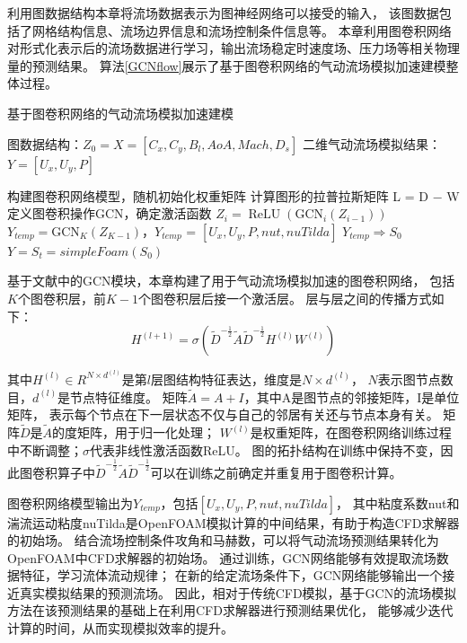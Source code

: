 利用图数据结构本章将流场数据表示为图神经网络可以接受的输入，
该图数据包括了网格结构信息、流场边界信息和流场控制条件信息等。
本章利用图卷积网络对形式化表示后的流场数据进行学习，输出流场稳定时速度场、压力场等相关物理量的预测结果。
算法\ref{GCNflow}展示了基于图卷积网络的气动流场模拟加速建模整体过程。

\renewcommand{\algorithmicrequire}{\textbf{输入：}}
\renewcommand{\algorithmicensure}{\textbf{输出：}}
\begin{algorithm}[htbp]
	\caption{基于图卷积网络的气动流场模拟加速建模}
	\label{GCNflow}
	\begin{algorithmic}[1]
		\REQUIRE 图数据结构：$Z_{0} = X = [C_x, C_y, B_l, AoA, Mach, D_s]$ 
		\ENSURE  二维气动流场模拟结果：$Y = [ U_x,U_y, P]$
		
		\STATE 构建图卷积网络模型，随机初始化权重矩阵
		\STATE 计算图形的拉普拉斯矩阵 L = D − W
		\STATE 定义图卷积操作GCN，确定激活函数
		\STATE $Z_{i} = \operatorname{ReLU}\left(\mathrm{GCN}_{i}\left(Z_{i-1}\right)\right) $
		\ENDFOR
		\STATE $Y_{temp} = \mathrm{GCN}_{K}\left(Z_{K-1}\right)$，$Y_{temp}$ = $[ U_x,U_y, P, nut, nuTilda]$
		\STATE $Y_{temp} \Rightarrow S_0$ 
		\STATE $Y = S_t = simpleFoam(S_0)$  
	\end{algorithmic}
\end{algorithm}

基于文献\cite{2016Semi}中的GCN模块，本章构建了用于气动流场模拟加速的图卷积网络，
包括$K$个图卷积层，前$K-1$个图卷积层后接一个激活层。
层与层之间的传播方式如下：
\begin{equation}
H^{(l+1)}=\sigma\left(\tilde{D}^{-\frac{1}{2}} \tilde{A} \tilde{D}^{-\frac{1}{2}} H^{(l)} W^{(l)}\right)
\end{equation}

\noindent 其中$H^{(l)} \in R^{N \times d^{(l)}}$是第$l$层图结构特征表达，维度是$N \times d^{(l)}$，
$N$表示图节点数目，$d^{(l)}$是节点特征维度。
矩阵$\tilde{A} = A + I$，其中A是图节点的邻接矩阵，I是单位矩阵，
表示每个节点在下一层状态不仅与自己的邻居有关还与节点本身有关。
矩阵$\tilde{D}$是$\tilde{A}$的度矩阵，用于归一化处理；
$W^{(l)}$是权重矩阵，在图卷积网络训练过程中不断调整；$\sigma$代表非线性激活函数ReLU。
图的拓扑结构在训练中保持不变，因此图卷积算子中$\tilde{D}^{-\frac{1}{2}} \tilde{A} \tilde{D}^{-\frac{1}{2}}$可以在训练之前确定并重复用于图卷积计算。

图卷积网络模型输出为$Y_{temp}$，包括$[ U_x,U_y, P, nut, nuTilda]$，
其中粘度系数nut和湍流运动粘度nuTilda是OpenFOAM模拟计算的中间结果，有助于构造CFD求解器的初始场。
结合流场控制条件攻角和马赫数，可以将气动流场预测结果转化为OpenFOAM中CFD求解器的初始场。
通过训练，GCN网络能够有效提取流场数据特征，学习流体流动规律；
在新的给定流场条件下，GCN网络能够输出一个接近真实模拟结果的预测流场。
因此，相对于传统CFD模拟，基于GCN的流场模拟方法在该预测结果的基础上在利用CFD求解器进行预测结果优化，
能够减少迭代计算的时间，从而实现模拟效率的提升。


